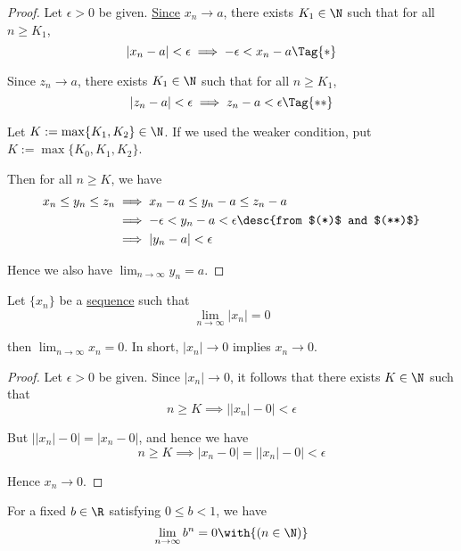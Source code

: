 \begin{proof}
  Let $\epsilon>0$ be given. \href{e565120}{Since} $x_n\to a$, there exists
  $K_1\in\N$ such that for all $n\geq K_1$,
  \begin{equation*}
    |x_n-a|<\epsilon \implies-\epsilon<x_n-a\Tag{*}
  \end{equation*}

  Since $z_n\to a$, there exists $K_1\in\N$ such that for all $n\geq K_1$,
  \begin{equation*}
    |z_n-a|<\epsilon \implies z_n-a<\epsilon\Tag{**}
  \end{equation*}

  Let $K:=\max\{K_1,K_2\}\in\N$. If we used the weaker condition, put
  $K:=\max\{K_0,K_1,K_2\}$.

  Then for all $n\geq K$, we have
  \begin{align*}
    x_n\leq y_n\leq z_n
     &\implies x_n-a\leq y_n-a\leq z_n-a                            \\
     &\implies -\epsilon<y_n-a<\epsilon\desc{from $(*)$ and $(**)$} \\
     &\implies |y_n-a|<\epsilon
  \end{align*}

  Hence we also have $\displaystyle\lim_{n\to\infty}y_n=a$.
\end{proof}

\label{a9a7a2f}

Let $\{x_n\}$ be a \href{b5fa0e4}{sequence} such that
$$
  \lim_{n\to\infty}|x_n|=0
$$

then $\lim_{n\to\infty}x_n=0$. In short, $|x_n|\to0$ implies $x_n\to0$.

\begin{proof}
  Let $\epsilon>0$ be given. Since $|x_n|\to0$, it follows that there exists
  $K\in\N$ such that
  $$
    n\geq K\implies \big||x_n|-0\big|<\epsilon
  $$

  But $\big||x_n|-0\big|=|x_n-0|$, and hence we have
  $$
    n\geq K\implies |x_n-0|=\big||x_n|-0\big|<\epsilon
  $$

  Hence $x_n\to0$.
\end{proof}

\label{b88d621}

For a fixed $b\in\R$ satisfying $0\leq b<1$, we have
$$
  \lim_{n\to\infty}b^n=0\with{(n\in\N)}
$$

